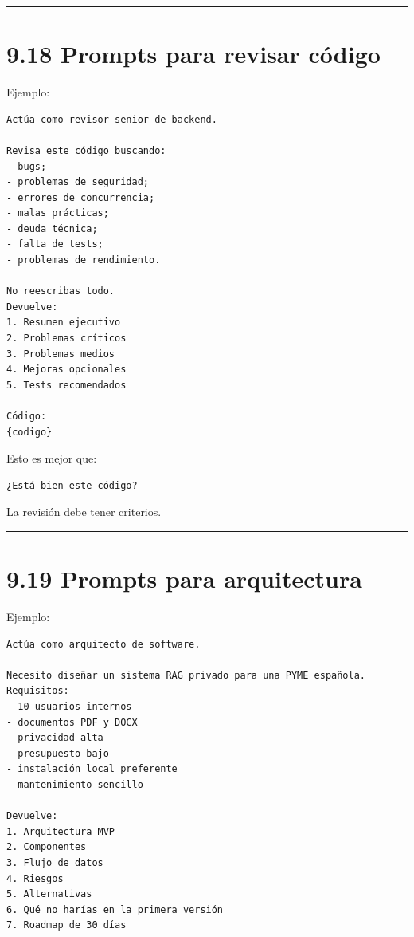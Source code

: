 \begin{center}\rule{0.5\linewidth}{0.5pt}\end{center}

\section{9.18 Prompts para revisar
código}\label{prompts-para-revisar-cuxf3digo}

Ejemplo:

\begin{lstlisting}
Actúa como revisor senior de backend.

Revisa este código buscando:
- bugs;
- problemas de seguridad;
- errores de concurrencia;
- malas prácticas;
- deuda técnica;
- falta de tests;
- problemas de rendimiento.

No reescribas todo.
Devuelve:
1. Resumen ejecutivo
2. Problemas críticos
3. Problemas medios
4. Mejoras opcionales
5. Tests recomendados

Código:
{codigo}
\end{lstlisting}

Esto es mejor que:

\begin{lstlisting}
¿Está bien este código?
\end{lstlisting}

La revisión debe tener criterios.

\begin{center}\rule{0.5\linewidth}{0.5pt}\end{center}

\section{9.19 Prompts para
arquitectura}\label{prompts-para-arquitectura}

Ejemplo:

\begin{lstlisting}
Actúa como arquitecto de software.

Necesito diseñar un sistema RAG privado para una PYME española.
Requisitos:
- 10 usuarios internos
- documentos PDF y DOCX
- privacidad alta
- presupuesto bajo
- instalación local preferente
- mantenimiento sencillo

Devuelve:
1. Arquitectura MVP
2. Componentes
3. Flujo de datos
4. Riesgos
5. Alternativas
6. Qué no harías en la primera versión
7. Roadmap de 30 días
\end{lstlisting}

